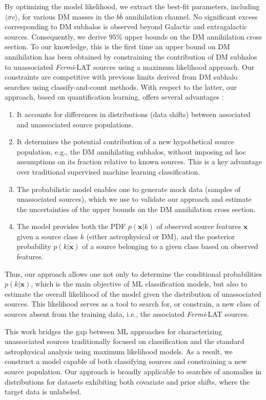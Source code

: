 \documentclass[12pt, a4paper]{article}
\newcommand{\Fermi}{\textsl{Fermi}}
\newcommand{\sigmav}{\langle \sigma v \rangle}
\begin{document}
By optimizing the model likelihood, we extract the best-fit parameters, including $\sigmav$, for various DM masses in the $b\bar{b}$ annihilation channel.
No significant excess corresponding to DM subhalos is observed beyond Galactic and extragalactic sources.
Consequently, we derive 95\% upper bounds on the DM annihilation cross section. To our knowledge, this is the first time an upper bound on DM annihilation has been obtained by constraining the contribution of DM subhalos to unassociated \Fermi-LAT sources using a maximum likelihood approach.
Our constraints are competitive with previous limits derived from DM subhalo searches using classify-and-count methods.
With respect to the latter, our approach, based on quantification learning, offers several advantages :
\begin{enumerate}[label=(\roman*)]
    \item It accounts for differences in distributions (data shifts) between associated and unassociated source populations.
    \item It determines the potential contribution of a new hypothetical source population, e.g., the DM annihilating subhalos, without imposing ad hoc assumptions on its fraction relative to known sources. This is a key advantage over traditional supervised machine learning classification.
    \item The probabilistic model enables one to generate mock data (samples of unassociated sources), which we use to validate our approach and estimate the uncertainties of the upper bounds on the DM annihilation cross section. 
    \item The model provides both the PDF $p(\mathbf{x}|k)$ of observed source features $\mathbf{x}$ given a source class $k$ (either astrophysical or DM), and the posterior probability $p(k|\mathbf{x})$ of a source belonging to a given class based on observed features.
\end{enumerate}
Thus, our approach allows one not only to determine
the conditional probabilities $p(k|\mathbf{x})$, which is the main objective of ML classification models, but also to estimate the overall likelihood of the model given the distribution of unassociated sources. This likelihood serves as a tool to search for, or constrain, a new class of sources absent from the training data, i.e., the associated \Fermi-LAT sources.

This work bridges the gap between ML approaches for characterizing unassociated sources traditionally focused on classification and the standard astrophysical analysis using maximum likelihood models. As a result, we construct a model capable of both classifying sources and constraining a new source population. 
Our approach is broadly applicable to searches of anomalies in distributions for datasets exhibiting both covariate and prior shifts, where the target data is unlabeled.
\end{document}
